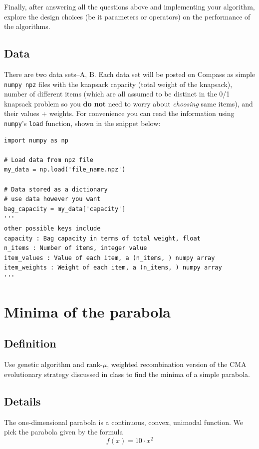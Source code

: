 \documentclass[11pt]{article}
\begin{document}
Finally, after answering all the questions above and implementing your
algorithm, explore the design choices (be it parameters or operators) on the
performance of the algorithms.
\subsection{Data}
\label{sec:data}
There are two data sets--A, B. Each data set will be posted on Compass as
simple \texttt{numpy npz} files with the knapsack capacity (total weight of the
knapsack), number of different items (which are all assumed to be distinct in
the 0/1 knapsack problem so you \textbf{do not} need to worry about \emph{choosing} same
items), and their values + weights. For convenience you can read the
information using \texttt{numpy}'s \texttt{load} function, shown in the snippet below:

\begin{verbatim}
import numpy as np

# Load data from npz file
my_data = np.load('file_name.npz')

# Data stored as a dictionary
# use data however you want
bag_capacity = my_data['capacity']
'''
other possible keys include
capacity : Bag capacity in terms of total weight, float
n_items : Number of items, integer value
item_values : Value of each item, a (n_items, ) numpy array
item_weights : Weight of each item, a (n_items, ) numpy array
'''

\end{verbatim}

\section{Minima of the parabola}
\label{sec:org531371d}
\subsection{Definition}
\label{sec:org1cb1152}
  Use genetic algorithm and rank-\(\mu\), weighted recombination version of the CMA
evolutionary strategy discussed in class to find the minima of a simple parabola.
\subsection{Details}
\label{sec:orgbd4bf86}
The one-dimensional parabola is a continuous, convex, unimodal function. We
pick the parabola given by the formula
\begin{equation}
f(x) = 10 \cdot x^2
\end{equation}
\end{document}

